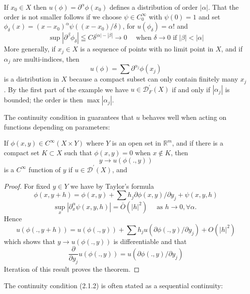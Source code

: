 \begin{example}
    If $x_{0} \in X$ then $u(\phi)=\partial^{\alpha} \phi\left(x_{0}\right)$ defines a distribution of order $|\alpha|$. That the order is not smaller follows if we choose $\psi \in C_{0}^{\infty}$ with $\psi(0)=1$ and set $\phi_{\delta}(x)=\left(x-x_{0}\right)^{\alpha} \psi\left(\left(x-x_{0}\right) / \delta\right)$, for $u\left(\phi_{\delta}\right)=\alpha!$ and
    \[
    \sup \left|\partial^{\beta} \phi_{\delta}\right| \leqq C \delta^{|\alpha|-|\beta|} \rightarrow 0 \quad \text { when } \delta \rightarrow 0 \text { if }|\beta|<|\alpha|
    \]
    More generally, if $x_{j} \in X$ is a sequence of points with no limit point in $X$, and if $\alpha_{j}$ are multi-indices, then
    \[
    u(\phi)=\sum \partial^{\alpha_{j}} \phi\left(x_{j}\right)
    \]
    is a distribution in $X$ because a compact subset can only contain finitely many $x_{j}$. By the first part of the example we have $u \in \mathscr{D}_{F}^{\prime}(X)$ if and only if $\left|\alpha_{j}\right|$ is bounded; the order is then $\max |\alpha_{j}|$.
    
    The continuity condition in  guarantees that $u$ behaves well when acting on functions depending on parameters:
\begin{theorem}
    If $\phi(x, y) \in C^{\infty}(X \times Y)$ where $Y$ is an open set in $\mathbb{R}^{m}$, and if there is a compact set $K \subset X$ such that $\phi(x, y)=0$ when $x \notin K$, then
    \[
    y \rightarrow u(\phi(., y))
    \]
    is a $C^{\infty}$ function of $y$ if $u \in \mathscr{D}^{\prime}(X)$, and
\end{theorem}
   \begin{proof}
    For fixed $y \in Y$ we have by Taylor's formula
    \[
    \phi(x, y+h)=\phi(x, y)+\sum h_{j} \partial \phi(x, y) / \partial y_{j}+\psi(x, y, h)
    \]
    \[
    \sup _{x}\left|\partial_{x}^{\alpha} \psi(x, y, h)\right|=\bar{O}\left(|h|^{2}\right) \quad \text { as } h \rightarrow 0, \forall \alpha \text {. }
    \]
    Hence
    \[
    u(\phi(., y+h))=u(\phi(., y))+\sum h_{j} u\left(\partial \phi(., y) / \partial y_{j}\right)+O\left(|h|^{2}\right)
    \]
    which shows that $y \rightarrow u(\phi(., y))$ is differentiable and that
    \[
    \frac{\partial}{\partial y_{j}} u(\phi(., y))=u\left(\partial \phi(., y) / \partial y_{j}\right)
    \]
    Iteration of this result proves the theorem.
   \end{proof}
\end{example}

The continuity condition (2.1.2) is often stated as a sequential continuity:

